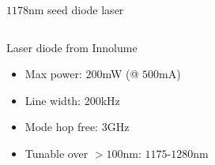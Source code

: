 \documentclass{beamer}
\begin{document}
\begin{frame}{$1178$nm seed diode laser}
  \begin{columns}
    \column{4cm}
    \column{7cm}
    \vspace{-0.8cm}
    \begin{center}
      \begin{block}{Laser diode from Innolume}
        \begin{itemize}
        \item<2-> Max power: $200$mW (@ $500$mA)
        \item<3-> Line width: $200$kHz
        \item<4-> Mode hop free: $3$GHz
        \item<5-> Tunable over $>100$nm: $1175$-$1280$nm
        \end{itemize}
      \end{block}
    \end{center}
  \end{columns}
\end{frame}

\end{document}
